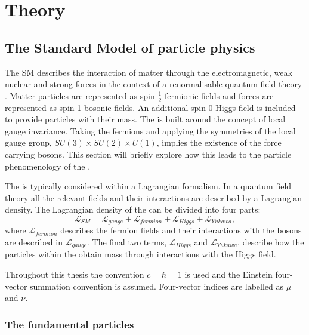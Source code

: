 \chapter{Theory}
\label{chap:theory}


\section{The Standard Model of particle physics}
\label{sec:sm}

The \ac{SM} describes the interaction of matter through the
electromagnetic, weak nuclear and strong forces in the context of a
renormalisable quantum field theory
\cite{Salam:1964ry,Glashow:1961tr,PhysRevLett.19.1264}. Matter
particles are represented as spin-$\frac{1}{2}$ fermionic fields and
forces are represented as spin-1 bosonic fields. An additional spin-0
Higgs field is included to provide particles with their mass. The \SM
is built around the concept of local gauge invariance. Taking the
fermions and applying the symmetries of the \SM local gauge group,
$SU(3)\times SU(2) \times U(1)$, implies the existence of the force
carrying bosons. This section will briefly explore how this leads to
the particle phenomenology of the \SM.

The \SM is typically considered within a Lagrangian formalism. In a
quantum field theory all the relevant fields and their
interactions are described by a Lagrangian density. The Lagrangian
density of the \SM can be divided into four parts:
\begin{equation}
\mathcal{L}_{SM}=\mathcal{L}_{gauge}+\mathcal{L}_{fermion}+\mathcal{L}_{Higgs}+\mathcal{L}_{Yukawa},
\end{equation}
where $\mathcal{L}_{fermion}$ describes the fermion
fields and their interactions with the bosons are described in
$\mathcal{L}_{gauge}$. The final two terms, $\mathcal{L}_{Higgs}$ and
$\mathcal{L}_{Yukawa}$, describe how the particles within the \SM
obtain mass through interactions with the Higgs field.

Throughout this thesis the convention $c=\hbar = 1$ is used and the
Einstein four-vector summation convention is assumed. Four-vector indices
are labelled as $\mu$ and $\nu$.

\subsection{The fundamental particles}

